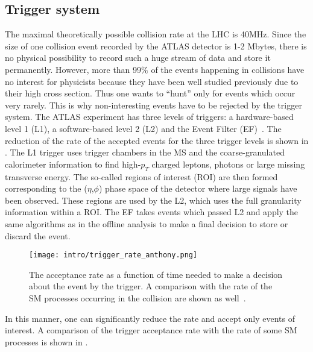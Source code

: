 \subsection{Trigger system}
The maximal theoretically possible collision rate at the LHC is 40MHz.
Since the size of one \pp collision event recorded by the ATLAS detector is 1-2 Mbytes, there is no physical possibility to record such a huge stream of data and store it permanently. However, more than 99$\%$ of the events happening in \pp collisions have no interest for physicists because they have been well studied previously due to their high cross section. Thus one wants to ``hunt'' only for events which occur very rarely. This is why non-interesting events have to be rejected by the trigger system.
The ATLAS experiment has three levels of triggers: a hardware-based level 1 (L1), a software-based level 2 (L2) and the Event Filter (EF)~\cite{tdr_tdaq}.
The reduction of the rate of the accepted events for the three trigger levels is shown in .
The L1 trigger uses trigger chambers in the MS and the coarse-granulated calorimeter information to find high-$p_T$ charged leptons, photons or large missing transverse energy. The so-called regions of interest (ROI) are then formed corresponding to the ($\eta$,$\phi$) phase space of the detector where large signals have been observed. These regions are used by the L2, which uses the full granularity information within a ROI. The EF takes events which passed L2 and apply the same algorithms as in the offline analysis to make a final decision to store or discard the event.

\begin{figure}[h!]
\centering
 \texttt{[image: intro/trigger\_rate\_anthony.png]}
 \caption{The acceptance rate as a function of time needed to make a decision about the event by the trigger. A comparison with the rate of the SM processes occurring in the \pp collision are shown as well~\cite{anthony_thesis}.}
\label{fig:trigger_rate}
\end{figure}

In this manner, one can significantly reduce the rate and accept only events of interest. A comparison of the  trigger acceptance rate with the rate of some SM processes is shown in .


